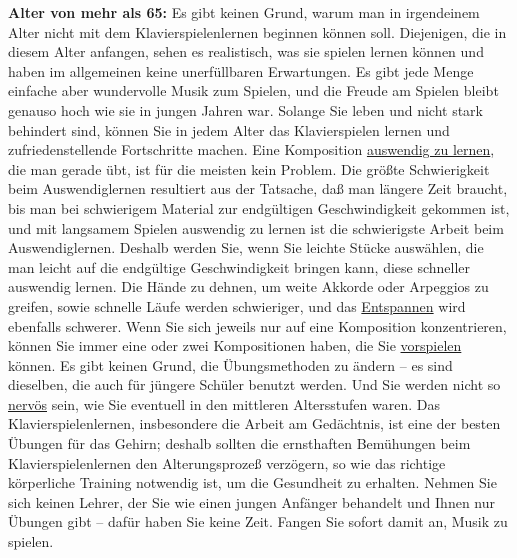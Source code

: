 \label{c1iii18c65}

\textbf{Alter von mehr als 65:}
Es gibt keinen Grund, warum man in irgendeinem Alter nicht mit dem Klavierspielenlernen beginnen können soll.
Diejenigen, die in diesem Alter anfangen, sehen es realistisch, was sie spielen lernen können und haben im allgemeinen keine unerfüllbaren Erwartungen.
Es gibt jede Menge einfache aber wundervolle Musik zum Spielen, und die Freude am Spielen bleibt genauso hoch wie sie in jungen Jahren war.
Solange Sie leben und nicht stark behindert sind, können Sie in jedem Alter das Klavierspielen lernen und zufriedenstellende Fortschritte machen.
Eine Komposition \hyperref[c1iii6]{auswendig zu lernen}, die man gerade übt, ist für die meisten kein Problem.
Die größte Schwierigkeit beim Auswendiglernen resultiert aus der Tatsache, daß man längere Zeit braucht, bis man bei schwierigem Material zur endgültigen Geschwindigkeit gekommen ist, und mit langsamem Spielen auswendig zu lernen ist die schwierigste Arbeit beim Auswendiglernen.
Deshalb werden Sie, wenn Sie leichte Stücke auswählen, die man leicht auf die endgültige Geschwindigkeit bringen kann, diese schneller auswendig lernen.
Die Hände zu dehnen, um weite Akkorde oder Arpeggios zu greifen, sowie schnelle Läufe werden schwieriger, und das \hyperref[c1ii14]{Entspannen} wird ebenfalls schwerer.
Wenn Sie sich jeweils nur auf eine Komposition konzentrieren, können Sie immer eine oder zwei Kompositionen haben, die Sie \hyperref[c1iii14]{vorspielen} können.
Es gibt keinen Grund, die Übungsmethoden zu ändern -- es sind dieselben, die auch für jüngere Schüler benutzt werden.
Und Sie werden nicht so \hyperref[c1iii15]{nervös} sein, wie Sie eventuell in den mittleren Altersstufen waren.
Das Klavierspielenlernen, insbesondere die Arbeit am Gedächtnis, ist eine der besten Übungen für das Gehirn; deshalb sollten die ernsthaften Bemühungen beim Klavierspielenlernen den Alterungsprozeß verzögern, so wie das richtige körperliche Training notwendig ist, um die Gesundheit zu erhalten.
Nehmen Sie sich keinen Lehrer, der Sie wie einen jungen Anfänger behandelt und Ihnen nur Übungen gibt -- dafür haben Sie keine Zeit.
Fangen Sie sofort damit an, Musik zu spielen.




